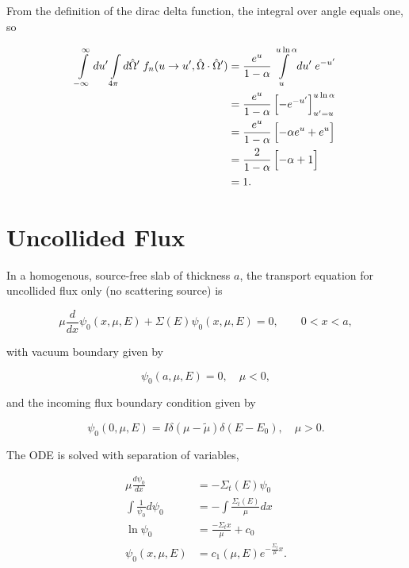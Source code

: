 \documentclass{hw-template}
\newcommand{\p}{^\prime}
\newcommand{\hOm}{\hat{\Omega}}
\begin{document}
From the definition of the dirac delta function, the integral over angle equals one, so

\begin{align}
    \int\limits_{-\infty}^{\infty}du\p \int\limits_{4\pi}d\hOm\p \; f_n(u \rightarrow u\p, \hOm \cdot \hOm\p)&= \frac{e^u}{1-\alpha}\int\limits_{u}^{u\ln\alpha}du\p\; e^{-u\p}\\
    &= \frac{e^u}{1-\alpha} \left[-e^{-u\p}\vphantom{\frac{}{}} \right]_{u\p = u}^{u\ln\alpha}\\
    &= \frac{e^u}{1-\alpha} \left[-\alpha e^u + e^u\vphantom{\frac{}{}} \right]\\
    &= \frac{2}{1-\alpha} \left[-\alpha + 1\vphantom{\frac{}{}} \right]\\
    &= 1.
\end{align}

\section{Uncollided Flux}

In a homogenous, source-free slab of thickness $a$, the transport equation for uncollided flux only (no scattering source) is

\begin{equation}
    \mu \frac{d}{dx}\psi_0(x, \mu, E) + \Sigma(E)\psi_0(x, \mu, E) = 0, \qquad 0< x< a,
\end{equation}

with vacuum boundary given by

\begin{equation}
    \psi_0(a, \mu, E) = 0, \quad \mu < 0,
\end{equation}

and the incoming flux boundary condition given by

\begin{equation}
    \psi_0(0, \mu, E) = I \delta(\mu - \tilde{\mu})\delta(E-E_0), \quad \mu > 0.
\end{equation}

The ODE is solved with separation of variables,

\begin{align}
    \mu \frac{d\psi_0}{dx} &= - \Sigma_t(E)\psi_0\\
    \int \frac{1}{\psi_0} d\psi_0 &= - \int\frac{\Sigma_t(E)}{\mu} dx\\
    \ln \psi_0 &= \frac{-\Sigma_t x}{\mu} + c_0\\
    \psi_0(x, \mu, E) &= c_1(\mu, E) e^{-\frac{\Sigma_t}{\mu}x}.
\end{align}
\end{document}
